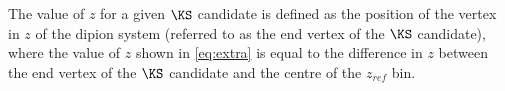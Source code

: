 
The value of $z$ for a given $\KS$ candidate is defined as the position of the vertex in $z$ of the dipion system (referred to as the end vertex of the $\KS$ candidate), where the value of $z$ shown in \autoref{eq:extra} is equal to the difference in $z$ between the end vertex of the $\KS$ candidate and the centre of the $z_{ref}$ bin. 

